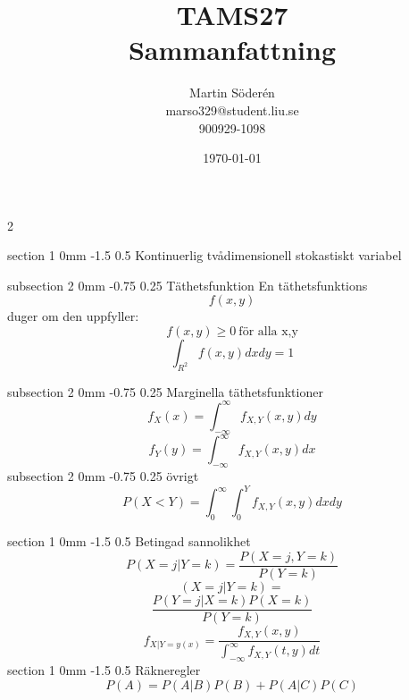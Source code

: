 \documentclass[a4paper,11pt]{article}
\makeatletter
\renewcommand{\section}{\@startsection
   {section}%
   {1}%
   {0mm}%
   {-1.5\baselineskip}%
   {0.5\baselineskip}%
   {\sffamily\bfseries\upshape\normalsize}}%
\renewcommand{\subsection}{\@startsection
   {subsection}%
   {2}%
   {0mm}%
   {-0.75\baselineskip}%
   {0.25\baselineskip}%
   {\rmfamily\normalfont\slshape\normalsize}}%
\makeatother
\begin{document}
\begin{titlepage}
\title{TAMS27\\
Sammanfattning}
\author{Martin Söderén\\ marso329@student.liu.se\\900929-1098}
\date{\today}
\maketitle




\vfill %

\thispagestyle{empty}

\end{titlepage}
\begin{multicols}{2}

\section{Kontinuerlig tvådimensionell stokastiskt variabel}

\subsection{Täthetsfunktion}
En täthetsfunktions
$$f(x,y)$$
 duger om den uppfyller:
 $$f(x,y)\geq 0 \ \text{för alla x,y}$$
 $$\int_{R^2}{f(x,y)dxdy}=1$$
 
 \subsection{Marginella täthetsfunktioner}
 $$f_X(x)=\int_{-\infty}^{\infty}{f_{X,Y}(x,y)dy}$$
 $$f_Y(y)=\int_{-\infty}^{\infty}{f_{X,Y}(x,y)dx}$$
 \subsection{övrigt}
 $$P(X<Y)=\int_{0}^{\infty}{\int_{0}^{Y}{f_{X,Y}(x,y)dx dy}}$$
 
 \section{Betingad sannolikhet}
 $$P(X=j|Y=k)=\frac{P(X=j,Y=k)}{P(Y=k)}$$
$$(X=j|Y=k)=$$
$$\frac{P(Y=j|X=k)P(X=k)}{P(Y=k)}$$
$$f_{X|Y=y(x)}=\frac{f_{X,Y}(x,y)}{\int_{-\infty}^{\infty}{f_{X,Y}(t,y)dt}}$$
 \section{Räkneregler}
 $$P(A)=P(A|B)P(B)+P(A|C)P(C)$$


\end{multicols}
\end{document}
